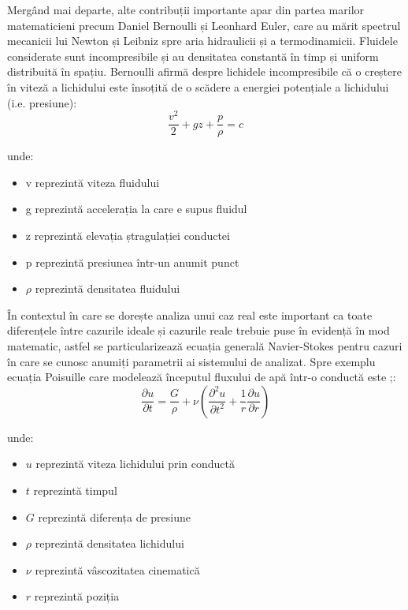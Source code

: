 Mergând mai departe, alte contribuții importante apar din partea marilor matematicieni precum Daniel Bernoulli și Leonhard Euler, care au mărit spectrul mecanicii lui Newton și Leibniz spre aria hidraulicii și a termodinamicii. Fluidele considerate sunt incompresibile și au densitatea constantă în timp și uniform distribuită în spațiu. Bernoulli afirmă despre lichidele incompresibile că o creștere în viteză a lichidului este însoțită de o scădere a energiei potențiale a lichidului (i.e. presiune):
\begin{equation}
\frac{v^2}{2} + gz + \frac{p}{\rho} = c
\end{equation}

unde:
\begin{itemize}
\item v reprezintă viteza fluidului
\item g reprezintă accelerația la care e supus fluidul
\item z reprezintă elevația ștragulației conductei
\item p reprezintă presiunea într-un anumit punct
\item $\rho$ reprezintă densitatea fluidului
\end{itemize}

În contextul în care se dorește analiza unui caz real este important ca toate diferențele între cazurile ideale și cazurile reale trebuie puse în evidență în mod matematic, astfel se particularizează ecuația generală Navier-Stokes pentru cazuri în care se cunosc anumiți parametrii ai sistemului de analizat. Spre exemplu ecuația Poisuille care modelează începutul fluxului de apă într-o conductă este ;\cite{elger2016engineering}:
\begin{equation}
\frac{\partial u}{\partial t} = \frac{G}{\rho} + \nu \left( \frac{\partial^2 u}{\partial t^2} + \frac{1}{r}\frac{\partial u}{\partial{r}}\right)
\end{equation}

unde:
\begin{itemize}
\item $u$ reprezintă viteza lichidului prin conductă
\item $t$ reprezintă timpul
\item $G$ reprezintă diferența de presiune
\item $\rho$ reprezintă densitatea lichidului
\item $\nu$ reprezintă vâscozitatea cinematică
\item $r$ reprezintă poziția
\end{itemize}


